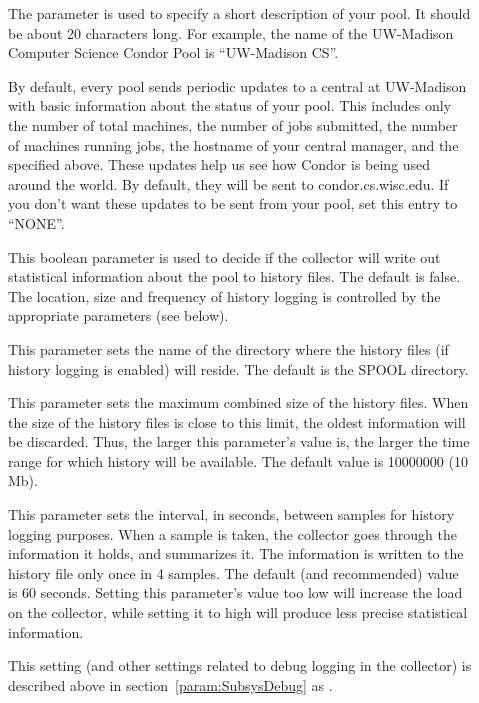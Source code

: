 \begin{description}
\item[] \label{param:CollectorName}
  The parameter is used to specify a short description of your pool.
  It should be about 20 characters long.  For example, the name of the
  UW-Madison Computer Science Condor Pool is ``UW-Madison CS''.  

\item[]
  \label{param:CondorDevelopersCollector} By default, every pool sends
  periodic updates to a central  at UW-Madison with
  basic information about the status of your pool.  This includes only
  the number of total machines, the number of jobs submitted, the
  number of machines running jobs, the hostname of your central
  manager, and the  specified above.  These
  updates help us see how Condor is being used around the world.  By
  default, they will be sent to condor.cs.wisc.edu.  If you don't want
  these updates to be sent from your pool, set this entry to
  ``NONE''. 

\item[] \label{param:KeepPoolHistory}
  This boolean parameter is used to decide if the collector will write
  out statistical information about the pool to history files. The default
  is false. The location, size and frequency of history logging is controlled
  by the appropriate parameters (see below).

\item[] \label{param:PoolHistoryDir}
  This parameter sets the name of the directory where the history
  files (if history logging is enabled) will reside.
  The default is the SPOOL directory.

\item[]
  \label{param:PoolHistoryMaxStorage} 
  This parameter sets the maximum combined size of the history files.
  When the size of the history files is close to this limit, the oldest
  information will be discarded.
  Thus, the larger this parameter's value is, the larger the time
  range for which history will be available.  The default value is
  10000000 (10 Mb).

\item[]
  \label{param:PoolHistorySamplingInterval}
  This parameter sets the interval, in seconds, between samples for
  history logging purposes. 
  When a sample is taken, the collector goes through the information
  it holds, and summarizes it.
  The information is written to the history file only once in 4
  samples.
  The default (and recommended) value is 60 seconds. Setting this
  parameter's value too low will increase the load on the collector,
  while setting it to high will produce less precise statistical
  information.

\item[] \label{param:CollectorDebug} This
  setting (and other settings related to debug logging in the
  collector) is described above in section~\ref{param:SubsysDebug} as
  .

\end{description}

